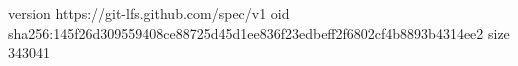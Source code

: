 version https://git-lfs.github.com/spec/v1
oid sha256:145f26d309559408ce88725d45d1ee836f23edbeff2f6802cf4b8893b4314ee2
size 343041
